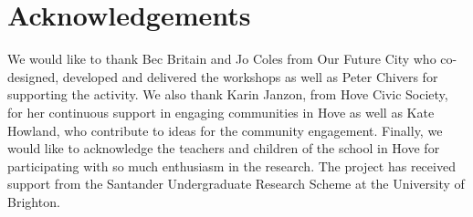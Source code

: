 \documentclass[acmlarge,screen,dvipsnames]{acmart}
\begin{document}
\section{Acknowledgements} We would like to thank Bec Britain and Jo Coles
from Our Future City who co-designed, developed and delivered the workshops as
well as Peter Chivers for supporting the activity. We also thank Karin Janzon,
from Hove Civic Society, for her continuous support in engaging communities in
Hove as well as Kate Howland, who contribute to ideas for the community engagement. 
Finally, we would like to acknowledge the teachers and children of the
school in Hove for participating with so much enthusiasm in the research. 
The project has received support from the Santander Undergraduate Research Scheme
at the University of Brighton.




%

 

\end{document}
